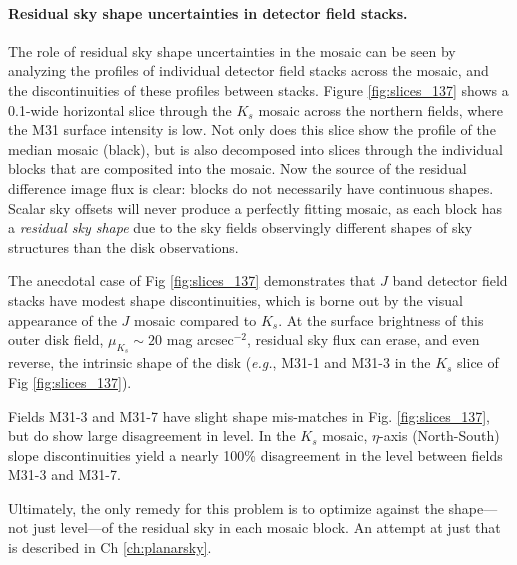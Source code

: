\documentclass[iop]{emulateapj}
\newcommand{\eg}{\textit{e.g.}}
\begin{document}
\paragraph{Residual sky shape uncertainties in detector field stacks.}


The role of residual sky shape uncertainties in the mosaic can be seen by analyzing the profiles of individual detector field stacks across the mosaic, and the discontinuities of these profiles between stacks. Figure \ref{fig:slices_137} shows a 0.1\arcdeg -wide horizontal slice through the $K_s$ mosaic across the northern fields, where the M31 surface intensity is low. Not only does this slice show the profile of the median mosaic (black), but is also decomposed into slices through the individual blocks that are composited into the mosaic. Now the source of the residual difference image flux is clear: blocks do not necessarily have continuous shapes. Scalar sky offsets will never produce a perfectly fitting mosaic, as each block has a \emph{residual sky shape} due to the sky fields observingly different shapes of sky structures than the disk observations.

The anecdotal case of Fig \ref{fig:slices_137} demonstrates that $J$ band detector field stacks have modest shape discontinuities, which is borne out by the visual appearance of the $J$ mosaic compared to $K_s$. At the surface brightness of this outer disk field, $\mu_{K_s}\sim 20$ mag arcsec$^{-2}$, residual sky flux can erase, and even reverse, the intrinsic shape of the disk (\eg, M31-1 and M31-3 in the $K_s$ slice of Fig \ref{fig:slices_137}).

Fields M31-3 and M31-7 have slight shape mis-matches in Fig. \ref{fig:slices_137}, but do show large disagreement in level. In the $K_s$ mosaic, $\eta$-axis (North-South) slope discontinuities yield a nearly 100\% disagreement in the level between fields M31-3 and M31-7.

Ultimately, the only remedy for this problem is to optimize against the shape---not just level---of the residual sky in each mosaic block. An attempt at just that is described in Ch \ref{ch:planarsky}.
\end{document}

